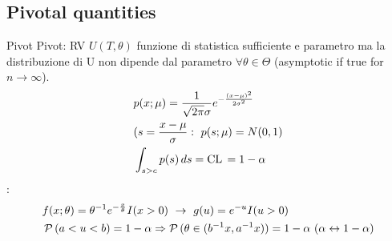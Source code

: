 \documentclass[asd-beamer.tex]{subfiles}%
\begin{document}
\subsection{Pivotal quantities}

\begin{frame}{Pivot}
Pivot: RV $U(T,\theta)$ funzione di statistica sufficiente e parametro ma la distribuzione di U non dipende dal parametro $\forall \theta\in\Theta$ (asymptotic if true for $n\to\infty$).
\begin{align*}
&p(x;\mu)=\frac{1}{\sqrt{2\pi}\sigma}e^{-\frac{(x-\mu)^2}{2\sigma^2}}\\
&(s=\frac{x-\mu}{\sigma}:\ p(s;\mu)=N(0,1)\\
&\int_{s>c}p(s)\,ds=\operatorname{CL}{}=1-\alpha
\end{align*}
:
\begin{align*}
&f(x;\theta)=\invers{\theta}\exp{-\frac{x}{\theta}}I(x>0)\ \to\ g(u)=\exp{-u}I(u>0)\\
&\prob{(a<u<b)}=1-\alpha\Rightarrow\prob{(\theta\in(\invers{b}x,\invers{a}x))}=1-\alpha\ (\alpha\leftrightarrow1-\alpha)
\end{align*}
\end{frame}
\end{document}
